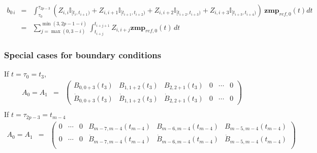 \documentclass {article}
\newcommand\zmprefx{\mathbf{zmp}_{ref, 0}}
\begin{document}
\begin{eqnarray*}
  b_{0\,i} &=& \int_{\tau_0}^{\tau_{2p-3}}(Z_{i, i} \mathbb{I}_{[t_i, t_{i+1})} + Z_{i,i+1} \mathbb{I}_{[t_{i+1}, t_{i+2})} +Z_{i,i+2} \mathbb{I}_{[t_{i+2}, t_{i+3})}+Z_{i,i+3} \mathbb{I}_{[t_{i+3}, t_{i+4})})\ \zmprefx(t)dt \\
  &=& \sum_{j=\max(0,3-i)}^{\min(3,2p-1-i)} \int_{t_{i+j}}^{t_{i+j+1}} Z_{i,i+j} \zmprefx(t)\,dt
\end{eqnarray*}

\subsubsection* {Special cases for boundary conditions}
If $t = \tau_0 = t_3$,
\begin{eqnarray*}
  A_0 = A_1 &=& \left(\begin{array}{cccccc}B_{0,0+3}(t_3)&B_{1,1+2}(t_3)&B_{2,2+1}(t_3)&0&\cdots&0\\
    \dot{B}_{0,0+3}(t_3)&\dot{B}_{1,1+2}(t_3)&\dot{B}_{2,2+1}(t_3)&0&\cdots&0\end{array}\right) \\
\end{eqnarray*}
If $t = \tau_{2p-3} = t_{m-4}$
\begin{eqnarray*}
  A_0 = A_1 &=& \left(\begin{array}{cccccc}0&\cdots&0&B_{m-7,m-4}(t_{m-4})&B_{m-6,m-4}(t_{m-4})&B_{m-5,m-4}(t_{m-4})\\
    0&\cdots&0&\dot{B}_{m-7,m-4}(t_{m-4})&\dot{B}_{m-6,m-4}(t_{m-4})&\dot{B}_{m-5,m-4}(t_{m-4})\\\end{array}\right) \\
\end{eqnarray*}
\end{document}
